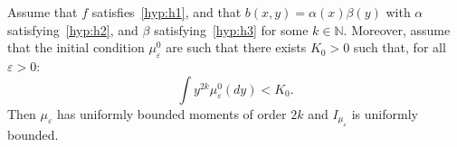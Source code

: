 \documentclass[onefignum,onetabnum]{siamart190516}
\newcommand{\1}{\mathbbm{1}}
\newcommand{\eps}{\varepsilon}
\begin{document}
%
\begin{lemma}
\label{lem:y2}
Assume that $f$ satisfies~\eqref{hyp:h1}, and that $b(x,y)=\alpha(x)\beta(y)$ with $\alpha$ satisfying~\eqref{hyp:h2}, and $\beta$ satisfying~\eqref{hyp:h3} for some $k\in\mathbb N$. Moreover, assume that the initial condition $\mu_\eps^0$ are such that there exists $K_0>0$ such that, for all $\eps>0$:
\[\int y^{2k}\mu_\eps^0(dy)<K_0.\] 
Then $\mu_\eps$ has uniformly bounded moments of order $2k$ and $I_{\mu_\eps}$ is uniformly bounded.


\end{lemma}
\end{document}
